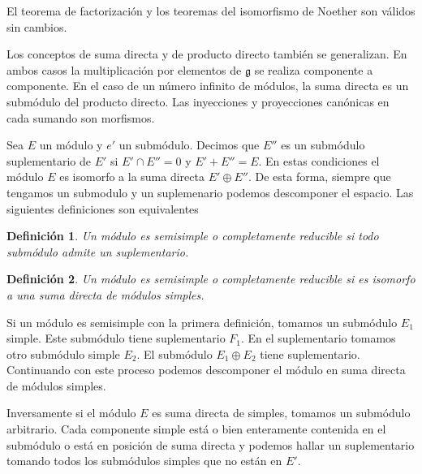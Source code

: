 \documentclass[a4paper,draft,12pt]{scrartcl}
\newtheorem{defi}{Definición}[section]%
\newcommand{\g}{\mathfrak{g}}%
\newcommand{\df}[1]{\textsf{\color{blue}#1}}
\begin{document}
El teorema de factorización y los teoremas del isomorfismo de Noether son válidos sin cambios.

\bigskip

Los conceptos de suma directa y de producto directo también se generalizan.  En ambos casos la multiplicación por elementos de $\g$ se realiza componente a componente.  En el caso de un número infinito de módulos, la suma directa es un submódulo del producto directo.  Las inyecciones y proyecciones canónicas en cada sumando son morfismos.

\bigskip

Sea $E$ un módulo y $e'$ un submódulo.  Decimos que $E''$ es un submódulo  \df{suplementario} de $E'$ si $E' \cap E''=0$ y $E'+E''= E$.  En estas condiciones el módulo $E$ es isomorfo a la suma directa $E' \oplus E''$.  De esta forma, siempre que tengamos un submodulo y un suplemenario podemos descomponer el espacio.  Las siguientes definiciones son equivalentes

\begin{defi}

Un módulo es  \df{semisimple}  o  \df{completamente reducible} si todo submódulo admite un suplementario.

\end{defi}

\begin{defi}

Un módulo es  \df{semisimple}  o  \df{completamente reducible} si es isomorfo a una suma directa de módulos simples.

\end{defi}

Si un módulo es semisimple con la primera definición, tomamos un submódulo $E_1$ simple.  Este submódulo tiene suplementario $F_1$. En el suplementario tomamos otro submódulo simple $E_2$.  El submódulo $E_1\oplus E_2$ tiene suplementario.  Continuando con este proceso podemos descomponer el módulo en suma directa de módulos simples.

Inversamente si el módulo $E$ es suma directa de simples, tomamos un submó\-dulo arbitrario.  Cada componente simple está o bien enteramente contenida en el submódulo o está en posición de suma directa y podemos hallar un suplementario tomando todos los submódulos simples que no están en $E'$.

\bigskip
\end{document}

